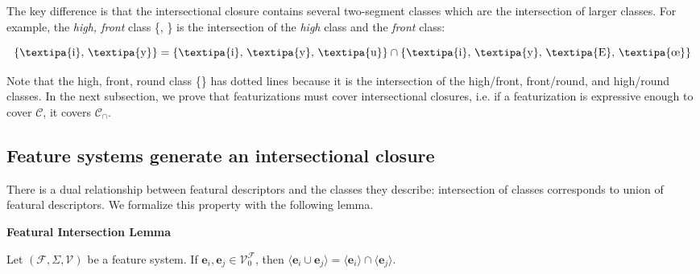 \documentclass[11pt, oneside]{article}   	%
\newenvironment{clump}
{
	\edef\myindent{\the\parindent}
	\noindent\begin{minipage}{\textwidth}
	\setlength\parindent{\myindent}\fussy
}
{
	\end{minipage}
}
\begin{document}
%

The key difference is that the intersectional closure contains several two-segment classes which are the intersection of larger classes. For example, the \textit{high, front} class \{, \} is the intersection of the \textit{high} class and the \textit{front} class:

$$ \text{\{\textipa{i}, \textipa{y}\}} = \text{\{\textipa{i}, \textipa{y}, \textipa{u}\}} \cap \text{\{\textipa{i}, \textipa{y}, \textipa{E}, \textipa{\oe}\}} $$

\vspace{\baselineskip} \noindent Note that the high, front, round class \{\} has dotted lines because it is the intersection of the high/front, front/round, and high/round classes. In the next subsection, we prove that featurizations must cover intersectional closures, i.e. if a featurization is expressive enough to cover $\mathcal C$, it covers $\mathcal C_\cap$.

\subsection{Feature systems generate an intersectional closure}

There is a dual relationship between featural descriptors and the classes they describe: intersection of classes corresponds to union of featural descriptors. We formalize this property with the following lemma.

\begin{clump}
\vspace{\baselineskip} \noindent \textbf{Featural Intersection Lemma}

\indent Let $(\mathcal F, \Sigma, \mathcal V)$ be a feature system. If $\mathbf{e}_i, \mathbf{e}_j \in \mathcal V_0^\mathcal F$, then $\langle \mathbf{e}_i \cup \mathbf{e}_j \rangle =  \langle \mathbf{e}_i \rangle \cap \langle \mathbf{e}_j \rangle$.
\end{clump}
\end{document}
